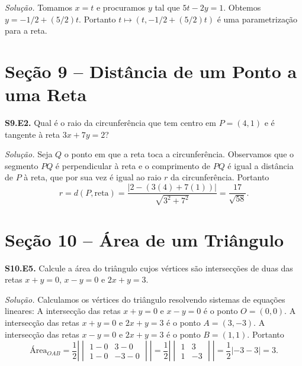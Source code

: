 \documentclass[a4paper,11pt]{article}
\begin{document}
\emph{Solução.}
Tomamos $x = t$ e procuramos $y$ tal que $5t - 2y = 1$.
Obtemos $y = -1/2 + (5/2)t$.
Portanto $t \mapsto (t, -1/2 + (5/2)t)$ é uma parametrização para a reta.

\section*{Seção 9 -- Distância de um Ponto a uma Reta}

\textbf{S9.E2.}
Qual é o raio da circunferência que tem centro em $P = (4,1)$ e é tangente à reta $3x + 7y = 2$?

\vspace{\baselineskip}

\emph{Solução.}
Seja $Q$ o ponto em que a reta toca a circunferência.
Observamos que o segmento $PQ$ é perpendicular à reta e o comprimento de $PQ$ é igual a distância de $P$ à reta, que por sua vez é igual ao raio $r$ da circunferência.
Portanto
\[
  r = d(P,\mathrm{reta}) = \frac{|2-(3(4) + 7(1))|}{\sqrt{3^2 + 7^2}} = \frac{17}{\sqrt{58}}.
\]

\vspace{\baselineskip}

\section*{Seção 10 -- Área de um Triângulo}

\textbf{S10.E5.}
Calcule a área do triângulo cujos vértices são intersecções de duas das retas $x+y=0$, $x-y=0$ e $2x+y=3$.

\vspace{\baselineskip}

\emph{Solução.}
Calculamos os vértices do triângulo resolvendo sistemas de equações lineares:
A intersecção das retas $x+y=0$ e $x-y=0$ é o ponto $O = (0,0)$.
A intersecção das retas $x+y=0$ e $2x+y=3$ é o ponto $A = (3,-3)$.
A intersecção das retas $x-y=0$ e $2x+y=3$ é o ponto $B = (1,1)$.
Portanto
\[
  \text{Área}_{OAB} =
  \frac{1}{2} \left|
  \begin{vmatrix}
    1-0 & 3-0 \\
    1-0 & -3-0
  \end{vmatrix}
  \right|
  =
  \frac{1}{2} \left|
  \begin{vmatrix}
    1 & 3 \\
    1 & -3
  \end{vmatrix}
  \right|
  = \frac{1}{2} |-3-3| = 3.
\]

\vspace{\baselineskip}
\end{document}
